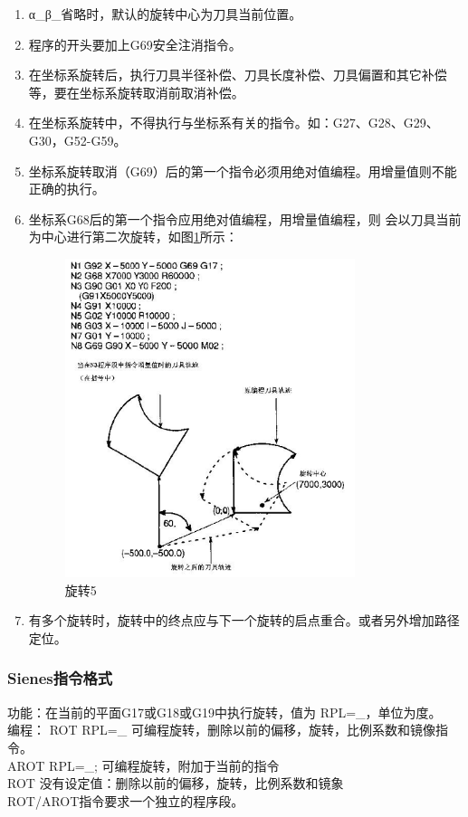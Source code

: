 \begin{enumerate}[A、]
	\item α\_β\_省略时，默认的旋转中心为刀具当前位置。
\item 程序的开头要加上G69安全注消指令。
\item 在坐标系旋转后，执行刀具半径补偿、刀具长度补偿、刀具偏置和其它补偿等，要在坐标系旋转取消前取消补偿。
\item 在坐标系旋转中，不得执行与坐标系有关的指令。如：G27、G28、G29、G30，G52-G59。
\item  坐标系旋转取消（G69）后的第一个指令必须用绝对值编程。用增量值则不能正确的执行。
\item 坐标系G68后的第一个指令应用绝对值编程，用增量值编程，则    会以刀具当前为中心进行第二次旋转，如图\ref{旋转5}所示：
\begin{figure}
	\centering	\includegraphics[width=0.8\textwidth]{images/7-1}
	\caption{旋转5} \label{旋转5}
\end{figure}
\item 有多个旋转时，旋转中的终点应与下一个旋转的启点重合。或者另外增加路径定位。
\end{enumerate}
\subsubsection{Sienes指令格式}
功能：在当前的平面G17或G18或G19中执行旋转，值为 RPL=\_，单位为度。\\
编程：    ROT RPL=\_  可编程旋转，删除以前的偏移，旋转，比例系数和镜像指令。\\
AROT RPL=\_; 可编程旋转，附加于当前的指令\\
ROT    没有设定值：删除以前的偏移，旋转，比例系数和镜象\\
ROT/AROT指令要求一个独立的程序段。

